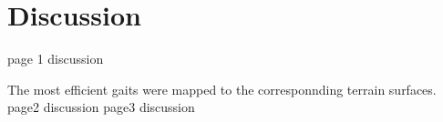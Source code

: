 \chapter{Discussion} \label{chap:discussion}
page 1 discussion

The most efficient gaits were mapped to the corresponnding terrain surfaces. 
\newpage
page2 discussion
\newpage
page3 discussion